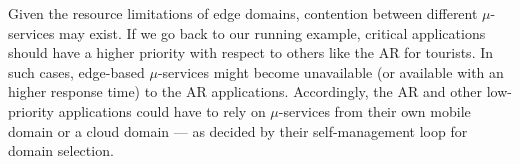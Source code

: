 Given the resource limitations of edge domains, contention between different $\mu$-services may exist. If we go back to our running example,
critical applications should have a higher priority with respect to others like the AR for tourists. In such cases, edge-based $\mu$-services might become unavailable (or available with an higher response time) to the AR applications. Accordingly, the AR and other low-priority applications could have to rely on $\mu$-services from their own mobile domain or a cloud domain --- as decided by their self-management loop for domain selection. 

%
%		
%		
%		








